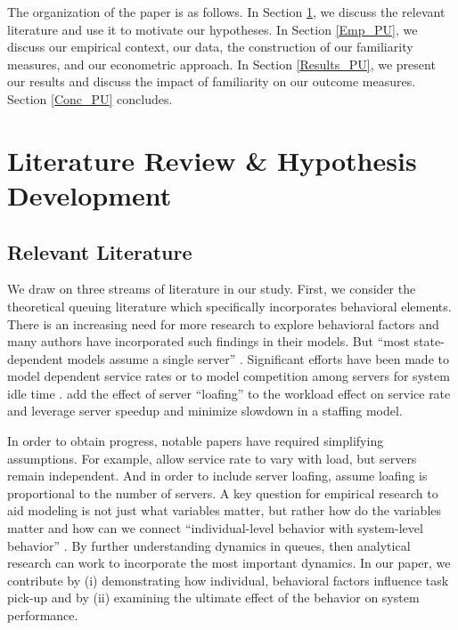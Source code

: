  The organization of the paper is as follows. In Section \ref{Lit_PU}, we discuss the relevant literature and use it to motivate our hypotheses. In Section \ref{Emp_PU}, we discuss our empirical context, our data, the construction of our familiarity measures, and our econometric approach. In Section \ref{Results_PU}, we present our results and discuss the impact of familiarity on our outcome measures. Section \ref{Conc_PU} concludes.
 
 
\section{Literature Review \& Hypothesis Development} \label{Lit_PU}
 \subsection{Relevant Literature} \label{reL_lit}
 We draw on three streams of literature in our study. First, we consider the theoretical queuing literature which specifically incorporates behavioral elements. There is an increasing need for more research to explore behavioral factors \citep{Armony2015} and many authors have incorporated such findings in their models. But “most state-dependent models assume a single server” \citep[p. 3]{Delasay2018}. Significant efforts have been made to model dependent service rates \citep{Chan2014, Dong2015} or to model competition among servers for system idle time \citep{Gopalakrishnan2016}. \cite{Do2018} add the effect of server “loafing” to the workload effect on service rate and \cite{Cho2019} leverage server speedup and minimize slowdown in a staffing model.
 
 In order to obtain progress, notable papers have required simplifying assumptions. For example, \cite{Chan2014} allow service rate to vary with load, but servers remain independent. And in order to include server loafing, \cite{Do2018} assume loafing is proportional to the number of servers. A key question for empirical research to aid modeling is not just what variables matter, but rather how do the variables matter and how can we connect “individual-level behavior with system-level behavior” \citep[p. 357]{Allon2019}. By further understanding dynamics in queues, then analytical research can work to incorporate the most important dynamics. In our paper, we contribute by (i) demonstrating how individual, behavioral factors influence task pick-up and by (ii) examining the ultimate effect of the behavior on system performance.
 
